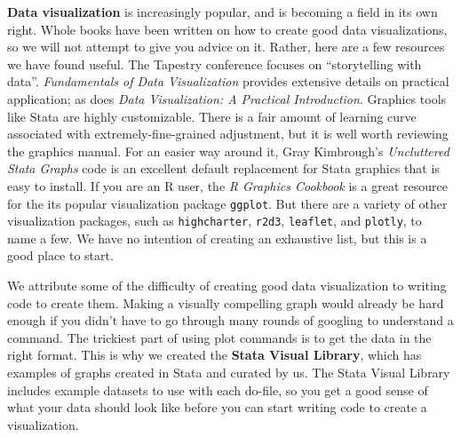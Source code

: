 \textbf{Data visualization} 
is increasingly popular, and is becoming a field in its own right.\cite{healy2018data,wilke2019fundamentals}
Whole books have been written on how to create good data visualizations,
so we will not attempt to give you advice on it.
Rather, here are a few resources we have found useful.
The Tapestry conference focuses on ``storytelling with data''.
\textit{Fundamentals of Data Visualization} provides extensive details on practical application;
as does \textit{Data Visualization: A Practical Introduction}.
Graphics tools like Stata are highly customizable.
There is a fair amount of learning curve associated with extremely-fine-grained adjustment,
but it is well worth reviewing the graphics manual.
For an easier way around it, Gray Kimbrough's \textit{Uncluttered Stata Graphs}
code is an excellent default replacement for Stata graphics that is easy to install.
If you are an R user, the \textit{R Graphics Cookbook}
is a great resource for the its popular visualization package \texttt{ggplot}.
But there are a variety of other visualization packages,
such as \texttt{highcharter},
\texttt{r2d3},
\texttt{leaflet},
and \texttt{plotly}, to name a few.
We have no intention of creating an exhaustive list, but this is a good place to start.

We attribute some of the difficulty of creating good data visualization
to writing code to create them.
Making a visually compelling graph would already be hard enough if
you didn't have to go through many rounds of googling to understand a command.
The trickiest part of using plot commands is to get the data in the right format.
This is why we created the \textbf{Stata Visual Library},
which has examples of graphs created in Stata and curated by us.
The Stata Visual Library includes example datasets to use with each do-file,
so you get a good sense of what your data should look like
before you can start writing code to create a visualization.

